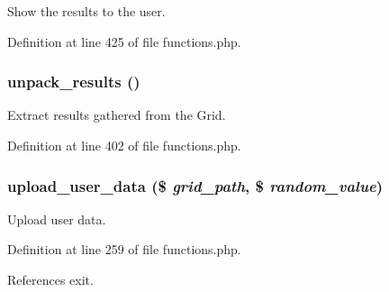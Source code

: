 Show the results to the user. 



Definition at line 425 of file functions.php.
\subsubsection{\setlength{\rightskip}{0pt plus 5cm}unpack\_\-results ()}\label{functions_8php_a10}


Extract results gathered from the Grid. 



Definition at line 402 of file functions.php.
\subsubsection{\setlength{\rightskip}{0pt plus 5cm}upload\_\-user\_\-data (\$ {\em grid\_\-path}, \$ {\em random\_\-value})}\label{functions_8php_a7}


Upload user data. 



Definition at line 259 of file functions.php.

References exit.